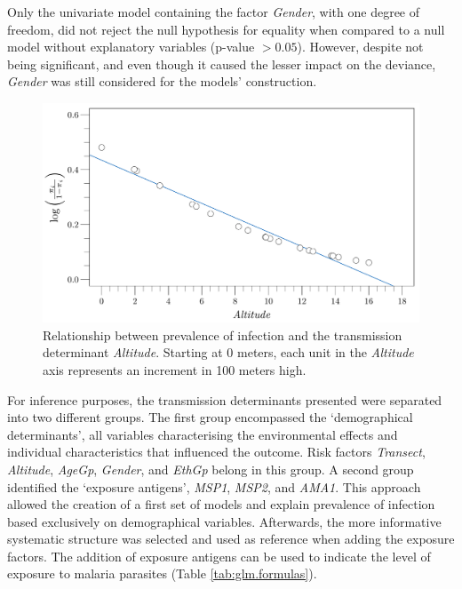 Only the univariate model containing the factor \textit{Gender}, with one degree of freedom, did not reject the null hypothesis for equality when compared to a null model without explanatory variables (p-value $>0.05$).
However, despite not being significant, and even though it caused the lesser impact on the deviance, \textit{Gender} was still considered for the models' construction.

\newpage

\begin{figure}[H]
\center
\begin{adjustbox}{width=14cm}
\includegraphics{images/altitude.pdf}
\end{adjustbox}
\caption[Relationship between transmission determinant \textit{Altitude} and respective log odds]{Relationship between prevalence of infection and the transmission determinant \textit{Altitude}. Starting at 0 meters, each unit in the \textit{Altitude} axis represents an increment in 100 meters high.}
\label{fig:altitude_curve}
\end{figure}

For inference purposes, the transmission determinants presented were separated into two different groups.
The first group encompassed the `demographical determinants', all variables characterising the environmental effects and individual characteristics that influenced the outcome.
Risk factors \textit{Transect}, \textit{Altitude}, \textit{AgeGp}, \textit{Gender}, and \textit{EthGp} belong in this group.
A second group identified the `exposure antigens', \textit{MSP1}, \textit{MSP2}, and \textit{AMA1}.
This approach allowed the creation of a first set of models and explain prevalence of infection based exclusively on demographical variables.
Afterwards, the more informative systematic structure was selected and used as reference when adding the exposure factors.
The addition of exposure antigens can be used to indicate the level of exposure to malaria parasites (Table \ref{tab:glm.formulas}).

